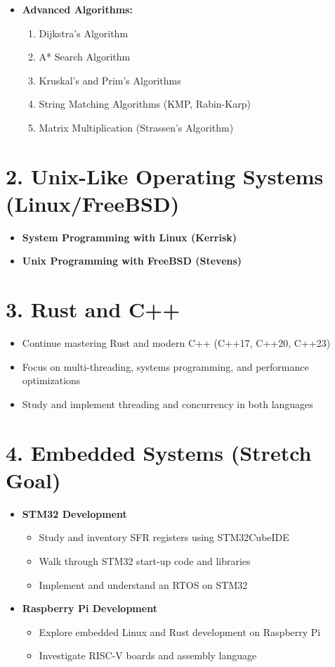 \documentclass{article}
\begin{document}
\begin{itemize}
    \item \textbf{Advanced Algorithms:}
    \begin{enumerate}
        \item Dijkstra’s Algorithm
        \item A* Search Algorithm
        \item Kruskal’s and Prim’s Algorithms
        \item String Matching Algorithms (KMP, Rabin-Karp)
        \item Matrix Multiplication (Strassen’s Algorithm)
    \end{enumerate}
\end{itemize}

\section*{2. Unix-Like Operating Systems (Linux/FreeBSD)}
\begin{itemize}
    \item \textbf{System Programming with Linux (Kerrisk)}
    \item \textbf{Unix Programming with FreeBSD (Stevens)}
\end{itemize}

\section*{3. Rust and C++}
\begin{itemize}
    \item Continue mastering Rust and modern C++ (C++17, C++20, C++23)
    \item Focus on multi-threading, systems programming, and performance optimizations
    \item Study and implement threading and concurrency in both languages
\end{itemize}

\section*{4. Embedded Systems (Stretch Goal)}
\begin{itemize}
    \item \textbf{STM32 Development}
    \begin{itemize}
        \item Study and inventory SFR registers using STM32CubeIDE
        \item Walk through STM32 start-up code and libraries
        \item Implement and understand an RTOS on STM32
    \end{itemize}
    \item \textbf{Raspberry Pi Development}
    \begin{itemize}
        \item Explore embedded Linux and Rust development on Raspberry Pi
        \item Investigate RISC-V boards and assembly language
    \end{itemize}
\end{itemize}
\end{document}
